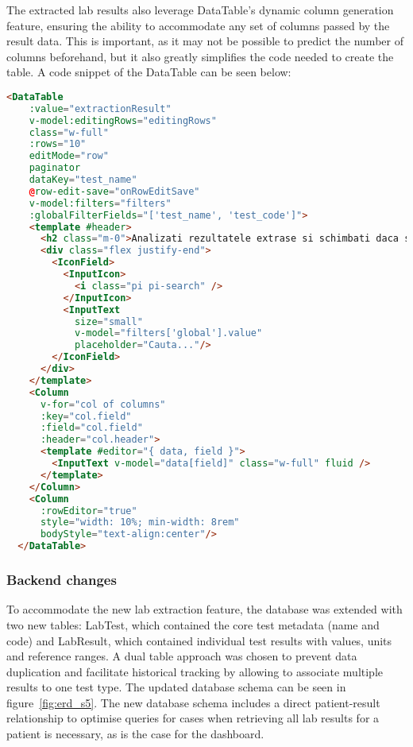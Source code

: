 The extracted lab results also leverage DataTable's dynamic column generation feature, ensuring the ability to accommodate any set of columns passed by the result data. This is important, as it may not be possible to predict the number of columns beforehand, but it also greatly simplifies the code needed to create the table. A code snippet of the DataTable can be seen below:

\begin{lstlisting}[language=HTML, caption=Dynamic DataTable for Lab Results]
  <DataTable
    :value="extractionResult"
    v-model:editingRows="editingRows"
    class="w-full"
    :rows="10"
    editMode="row"
    paginator
    dataKey="test_name"
    @row-edit-save="onRowEditSave"
    v-model:filters="filters"
    :globalFilterFields="['test_name', 'test_code']">
    <template #header>
      <h2 class="m-0">Analizati rezultatele extrase si schimbati daca sunt gresite</h2>
      <div class="flex justify-end">
        <IconField>
          <InputIcon>
            <i class="pi pi-search" />
          </InputIcon>
          <InputText
            size="small"
            v-model="filters['global'].value"
            placeholder="Cauta..."/>
        </IconField>
      </div>
    </template>
    <Column 
      v-for="col of columns" 
      :key="col.field" 
      :field="col.field" 
      :header="col.header">
      <template #editor="{ data, field }">
        <InputText v-model="data[field]" class="w-full" fluid />
      </template>
    </Column>
    <Column
      :rowEditor="true"
      style="width: 10%; min-width: 8rem"
      bodyStyle="text-align:center"/>
  </DataTable>
\end{lstlisting}

\subsubsection{Backend changes}

To accommodate the new lab extraction feature, the database was extended with two new tables: LabTest, which contained the core test metadata (name and code) and LabResult, which contained individual test results with values, units and reference ranges. A dual table approach was chosen to prevent data duplication and facilitate historical tracking by allowing to associate multiple results to one test type. The updated database schema can be seen in figure~\ref{fig:erd_s5}. The new database schema includes a direct patient-result relationship to optimise queries for cases when retrieving all lab results for a patient is necessary, as is the case for the dashboard.

